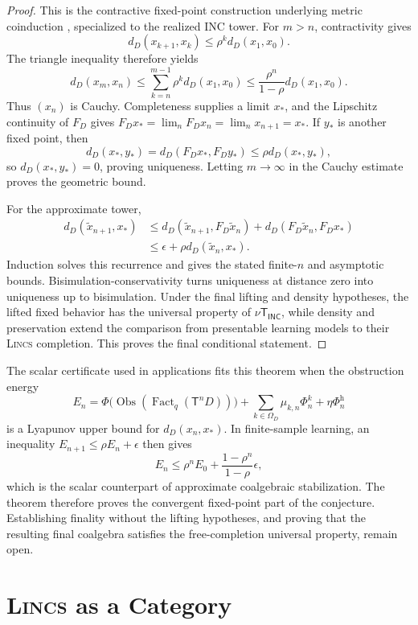 \documentclass{article}
\newcommand{\T}{\mathsf{T}}
\newcommand{\INC}{\mathsf{INC}}
\newcommand{\Fact}{\operatorname{Fact}}
\newcommand{\Obs}{\operatorname{Obs}}
\begin{document}
\begin{proof}
This is the contractive fixed-point construction underlying metric coinduction
\citep{kozen2009metric}, specialized to the realized INC tower.  
For \(m>n\), contractivity gives
\[
d_D(x_{k+1},x_k)
  \leq
  \rho^k d_D(x_1,x_0).
\]
The triangle inequality therefore yields
\[
d_D(x_m,x_n)
  \leq
  \sum_{k=n}^{m-1}\rho^k d_D(x_1,x_0)
  \leq
  \frac{\rho^n}{1-\rho}d_D(x_1,x_0).
\]
Thus \((x_n)\) is Cauchy.  Completeness supplies a limit \(x_\ast\), and the
Lipschitz continuity of \(F_D\) gives
\(F_Dx_\ast=\lim_nF_Dx_n=\lim_nx_{n+1}=x_\ast\).  If \(y_\ast\) is another
fixed point, then
\[
d_D(x_\ast,y_\ast)
  =d_D(F_Dx_\ast,F_Dy_\ast)
  \leq\rho d_D(x_\ast,y_\ast),
\]
so \(d_D(x_\ast,y_\ast)=0\), proving uniqueness.  Letting \(m\to\infty\) in
the Cauchy estimate proves the geometric bound.

For the approximate tower,
\[
\begin{aligned}
d_D(\widetilde x_{n+1},x_\ast)
&\leq d_D(\widetilde x_{n+1},F_D\widetilde x_n)
   +d_D(F_D\widetilde x_n,F_Dx_\ast)\\
&\leq \epsilon+\rho d_D(\widetilde x_n,x_\ast).
\end{aligned}
\]
Induction solves this recurrence and gives the stated finite-\(n\) and
asymptotic bounds.  Bisimulation-conservativity turns uniqueness at distance
zero into uniqueness up to bisimulation.  Under the final lifting and density
hypotheses, the lifted fixed behavior has the universal property of
\(\nu\T_{\INC}\), while density and preservation extend the comparison from
presentable learning models to their \textsc{Lincs}   completion.  This proves the final
conditional statement.\qedhere
\end{proof}

The scalar certificate used in applications fits this theorem when the
obstruction energy
\[
E_n
  =
  \Phi\big(\Obs(\Fact_q(\T^nD))\big)
  +
  \sum_{k\in\Omega_D}\mu_{k,n}\Phi^k_n
  +
  \eta\Phi^{\mathrm h}_n
\]
is a Lyapunov upper bound for \(d_D(x_n,x_\ast)\).  In finite-sample learning,
an inequality \(E_{n+1}\leq\rho E_n+\epsilon\) then gives
\[
E_n\leq\rho^nE_0+\frac{1-\rho^n}{1-\rho}\epsilon,
\]
which is the scalar counterpart of approximate coalgebraic stabilization.
The theorem therefore proves the convergent fixed-point part of the
conjecture.  Establishing finality without the lifting hypotheses, and proving
that the resulting final coalgebra satisfies the free-completion universal
property, remain open.

\section{\textsc{Lincs}   as a Category}
\end{document}
